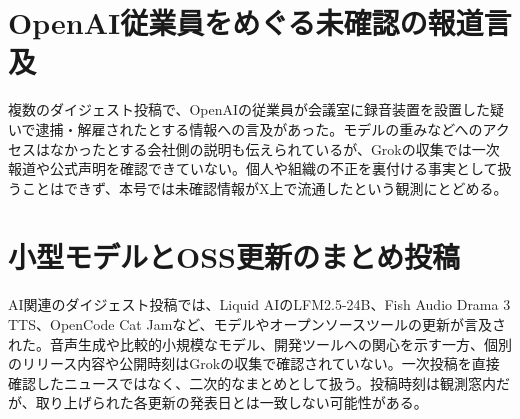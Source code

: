 \section{OpenAI従業員をめぐる未確認の報道言及}
複数のダイジェスト投稿で、OpenAIの従業員が会議室に録音装置を設置した疑いで逮捕・解雇されたとする情報への言及があった。モデルの重みなどへのアクセスはなかったとする会社側の説明も伝えられているが、Grokの収集では一次報道や公式声明を確認できていない。個人や組織の不正を裏付ける事実として扱うことはできず、本号では未確認情報がX上で流通したという観測にとどめる。

\section{小型モデルとOSS更新のまとめ投稿}
AI関連のダイジェスト投稿では、Liquid AIのLFM2.5-24B、Fish Audio Drama 3 TTS、OpenCode Cat Jamなど、モデルやオープンソースツールの更新が言及された。音声生成や比較的小規模なモデル、開発ツールへの関心を示す一方、個別のリリース内容や公開時刻はGrokの収集で確認されていない。一次投稿を直接確認したニュースではなく、二次的なまとめとして扱う。投稿時刻は観測窓内だが、取り上げられた各更新の発表日とは一致しない可能性がある。
